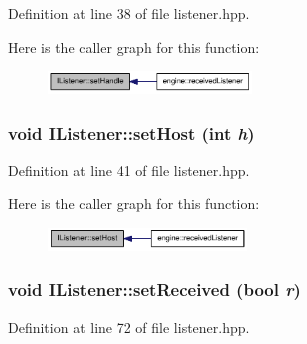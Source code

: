 Definition at line 38 of file listener.hpp.

Here is the caller graph for this function:\nopagebreak
\begin{figure}[H]
\begin{center}
\leavevmode
\includegraphics[width=153pt]{class_i_listener_a4649d89b151d60d9c9fe82e5f3a7a98d_icgraph}
\end{center}
\end{figure}
\hypertarget{class_i_listener_a0e9cfdf957b6e1fe454b7ca312115c2d}{
\subsubsection[{setHost}]{\setlength{\rightskip}{0pt plus 5cm}void IListener::setHost (int {\em h})}}
\label{class_i_listener_a0e9cfdf957b6e1fe454b7ca312115c2d}


Definition at line 41 of file listener.hpp.

Here is the caller graph for this function:\nopagebreak
\begin{figure}[H]
\begin{center}
\leavevmode
\includegraphics[width=149pt]{class_i_listener_a0e9cfdf957b6e1fe454b7ca312115c2d_icgraph}
\end{center}
\end{figure}
\hypertarget{class_i_listener_a48b905974e451f8ab3998dd212d06af1}{
\subsubsection[{setReceived}]{\setlength{\rightskip}{0pt plus 5cm}void IListener::setReceived (bool {\em r})}}
\label{class_i_listener_a48b905974e451f8ab3998dd212d06af1}


Definition at line 72 of file listener.hpp.

